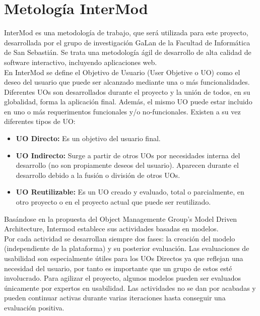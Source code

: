 \section{Metología InterMod}
\label{intermod}

InterMod es una metodología de trabajo, que será utilizada para este proyecto, desarrollada por el grupo de investigación GaLan de la Facultad de Informática de San Sebastián. Se trata una metodología ágil de desarrollo de alta calidad de software interactivo, incluyendo aplicaciones web.\\

En InterMod se define el Objetivo de Usuario (User Objetive o UO) como el deseo del usuario que puede ser alcanzado mediante una o más funcionalidades. Diferentes UOs son desarrollados durante el proyecto y la unión de todos, en su globalidad, forma la aplicación final. Además, el mismo UO puede estar incluido en uno o más requerimentos funcionales y/o no-funcionales. Existen a su vez diferentes tipos de UO:

\begin{itemize}
\item \textbf{UO Directo:} Es un objetivo del usuario final.
\item \textbf{UO Indirecto:} Surge a partir de otros UOs por necesidades interna del desarrollo (no son propiamente deseos del usuario). Aparecen durante el desarrollo debido a la fusión o división de otros UOs.
\item \textbf{UO Reutilizable:} Es un UO creado y evaluado, total o parcialmente, en otro proyecto o en el proyecto actual que puede ser reutilizado.
\end{itemize}

Basándose en la propuesta del Object Managemente Group’s Model Driven Architecture, Intermod establece sus actividades basadas en modelos.\\

Por cada actividad se desarrollan siempre dos fases: la creación del modelo (independiente de la plataforma) y su posterior evaluación. Las evaluaciones de usabilidad son especialmente útiles para los UOs Directos ya que reflejan una necesidad del usuario, por tanto es importante que un grupo de estos esté involucrado. Para agilizar el proyecto, algunos modelos pueden ser evaluados únicamente por expertos en usabilidad. Las actividades no se dan por acabadas y pueden continuar activas durante varias iteraciones hasta conseguir una evaluación positiva.\\

